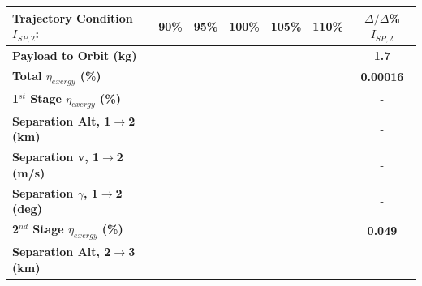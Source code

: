\begin{table}[ht] %
	\centering
	\begin{tabular}{l c c c c c c} 
		\hline \textbf{Trajectory Condition}   \qquad  $I_{SP,2}$:
		&90\%
		&95\%
		&100\%
		&105\%
		&110\%
		& $\Delta/\Delta$\%$I_{SP,2}$
		\\
		\hline \textbf{Payload to Orbit (kg)}
		& \textbf{\PayloadToOrbitIspNinety}
		& \textbf{\PayloadToOrbitIspNinetyFive}
		& \textbf{\PayloadToOrbitIspStandard}
		& \textbf{\PayloadToOrbitIspOneHundredFive}
		& \textbf{\PayloadToOrbitIspOneHundredTen}
		&\textbf{1.7}
		\\
		\textbf{Total $\eta_{exergy}$ (\%)}
		& \textbf{\totalExergyEffIspNinety}
		& \textbf{\totalExergyEffIspNinetyFive}
		& \textbf{\totalExergyEffIspStandard}
		& \textbf{\totalExergyEffIspOneHundredFive}
		& \textbf{\totalExergyEffIspOneHundredTen}
		& \textbf{0.00016}
		\\
		\hline 
		\textbf{1$^{st}$ Stage $\eta_{exergy}$ (\%)}
		& \textbf{\firstExergyEffIspNinety}
		& \textbf{\firstExergyEffIspNinetyFive}
		& \textbf{\firstExergyEffIspStandard}
		& \textbf{\firstExergyEffIspOneHundredFive}
		& \textbf{\firstExergyEffIspOneHundredTen}
		& -
		\\
		\textbf{Separation Alt, 1$\rightarrow$2 (km)}
		& \firstsecondSeparationAltIspNinety
		& \firstsecondSeparationAltIspNinetyFive
		& \firstsecondSeparationAltIspStandard
		& \firstsecondSeparationAltIspOneHundredFive
		& \firstsecondSeparationAltIspOneHundredTen
		& -
		\\
		\textbf{Separation v, 1$\rightarrow$2 (m/s)}
		& \firstsecondSeparationvIspNinety
		& \firstsecondSeparationvIspNinetyFive
		& \firstsecondSeparationvIspStandard
		& \firstsecondSeparationvIspOneHundredFive
		& \firstsecondSeparationvIspOneHundredTen
		& -
		\\
		\textbf{Separation $\gamma$, 1$\rightarrow$2 (deg)}
		& \firstsecondSeparationgammaIspNinety
		& \firstsecondSeparationgammaIspNinetyFive
		& \firstsecondSeparationgammaIspStandard
		& \firstsecondSeparationgammaIspOneHundredFive
		& \firstsecondSeparationgammaIspOneHundredTen
		& -
		\\
		\hline 
		\textbf{2$^{nd}$ Stage $\eta_{exergy}$ (\%)}
		& \textbf{\secondExergyEffIspNinety}
		& \textbf{\secondExergyEffIspNinetyFive}
		& \textbf{\secondExergyEffIspStandard}
		& \textbf{\secondExergyEffIspOneHundredFive}
		& \textbf{\secondExergyEffIspOneHundredTen}
		& \textbf{0.049}
		\\
		\textbf{Separation Alt, 2$\rightarrow$3 (km)}

\end{tabular}
\end{table}
